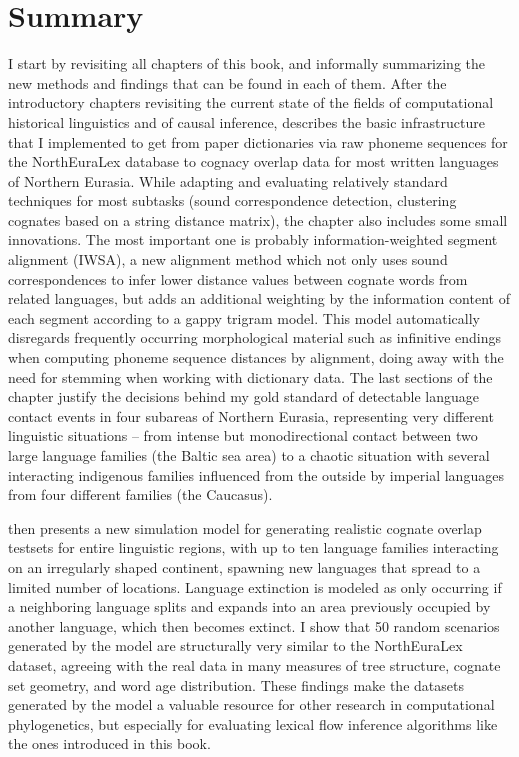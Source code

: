 \section{Summary}
I start by revisiting all chapters of this book, and informally summarizing the new methods and findings that can be found in each of them. After the introductory chapters revisiting the current state of the fields of computational historical linguistics and of causal inference,  describes the basic infrastructure that I implemented to get from paper dictionaries via raw phoneme sequences for the NorthEuraLex database to cognacy overlap data for most written languages of Northern Eurasia. While adapting and evaluating relatively standard techniques for most subtasks (sound correspondence detection, clustering cognates based on a string distance matrix), the chapter also includes some small innovations. The most important one is probably information-weighted segment alignment (IWSA), a new alignment method which not only uses sound correspondences to infer lower distance values between cognate words from related languages, but adds an additional weighting by the information content of each segment 
according to a gappy trigram model. This model automatically disregards frequently occurring morphological material such as infinitive endings when computing phoneme sequence distances by alignment, doing away with the need for stemming when working with dictionary data. The last sections of the chapter justify the decisions behind my gold standard of detectable language contact events in four subareas of Northern Eurasia, representing very different linguistic situations -- from intense but monodirectional contact between two large language families (the Baltic sea area) to a chaotic situation with several interacting indigenous families influenced from the outside by imperial languages from four different families (the Caucasus).

 then presents a new simulation model for generating realistic cognate overlap testsets for entire linguistic regions, with up to ten language families interacting on an irregularly shaped continent, spawning new languages that spread to a limited number of locations. Language extinction is modeled as only occurring if a neighboring language splits and expands into an area previously occupied by another language, which then becomes extinct. I show that 50 random scenarios generated by the model are structurally very similar to the NorthEuraLex dataset, agreeing with the real data in many measures of tree structure, cognate set geometry, and word age distribution. These findings make the datasets generated by the model a valuable resource for other research in computational phylogenetics, but especially for evaluating lexical flow inference algorithms like the ones introduced in this book.

